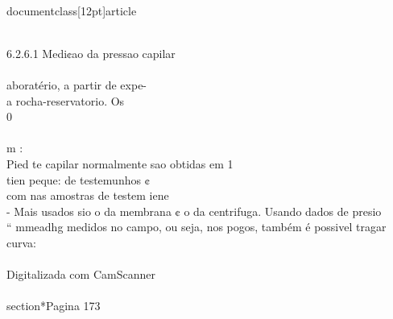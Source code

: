 \\documentclass[12pt]{article}
\begin{document}
\\
6.2.6.1 Medi¢ao da pressao capilar\\
\\
aboratério, a partir de expe-\\
a rocha-reservatorio. Os\\
0\\
\\
m :\\
Pied te capilar normalmente sao obtidas em 1\\
tien peque: de testemunhos ¢\\
com nas amostras de testem iene\\
- Mais usados sio o da membrana ¢ o da centrifuga. Usando dados de presio\\
“ mmeadhg medidos no campo, ou seja, nos pogos, também é possivel tragar curva:\\
\\
Digitalizada com CamScanner\\

\\section*{Pagina 173}
\end{document}
